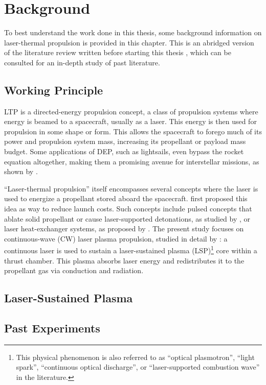 \chapter{Background}
    To best understand the work done in this thesis, some background information on laser-thermal propulsion is provided in this chapter. This is an abridged version of the literature review written before starting this thesis \cite{duplayReviewLaserThermalPropulsion2022}, which can be consulted for an in-depth study of past literature.

    \section{Working Principle}
        LTP is a directed-energy propulsion concept, a class of propulsion systems where energy is beamed to a spacecraft, usually as a laser. This energy is then used for propulsion in some shape or form. This allows the spacecraft to forego much of its power and propulsion system mass, increasing its propellant or payload mass budget. Some applications of DEP, such as lightsails, even bypass the rocket equation altogether, making them a promising avenue for interstellar missions, as shown by \textcite{lubinRoadmapInterstellarFlight2022}.

        ``Laser-thermal propulsion'' itself encompasses several concepts where the laser is used to energize a propellant stored aboard the spacecraft. \textcite{kantrowitzRelevanceSpace1971} first proposed this idea as way to reduce launch costs. Such concepts include pulsed concepts that ablate solid propellant or cause laser-supported detonations, as studied by \textcite{myraboPowerBeamingTechnologyLaser1984}, or laser heat-exchanger systems, as proposed by \textcite{kareLaserpoweredHeatExchanger1995}. The present study focuses on continuous-wave (CW) laser plasma propulsion, studied in detail by \textcite{keeferLaserSustainedPlasmas1989}: a continuous laser is used to sustain a laser-sustained plasma (LSP)\footnote{This physical phenomenon is also referred to as ``optical plasmotron'', ``light spark'', ``continuous optical discharge'', or ``laser-supported combustion wave'' in the literature.} core within a thrust chamber. This plasma absorbs laser energy and redistributes it to the propellant gas via conduction and radiation. 

    \section{Laser-Sustained Plasma}
    \section{Past Experiments}